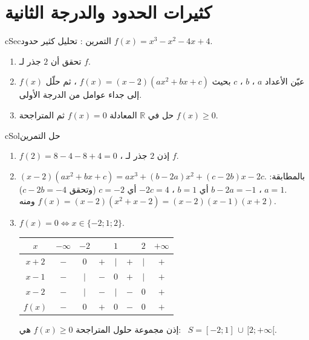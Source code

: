 \documentclass[12pt,a4paper]{article}
\newenvironment{BOX}[2]{\begin{otherlanguage}{english}\begin{arbox}{#1}{#2}}{\end{arbox}\end{otherlanguage}}
\newcounter{exo}
\newenvironment{tamrin}[1]{\stepcounter{exo}\begin{BOX}{cSec}{التمرين \theexo: #1}}{\end{BOX}}
\newenvironment{hal}{\Needspace{12\baselineskip}\begin{otherlanguage}{english}\begin{arbox}[breakable]{cSol}{حل التمرين \theexo}}{\end{arbox}\end{otherlanguage}}
\newcommand{\R}{\mathbb{R}}
\begin{document}
\section{كثيرات الحدود والدرجة الثانية}
\begin{tamrin}{تحليل كثير حدود}
$f(x)=x^3-x^2-4x+4$.
\begin{enumerate}
\item تحقق أن $2$ جذر لـ $f$.
\item عيّن الأعداد $a$ ، $b$ ، $c$ بحيث $f(x)=(x-2)\left(ax^2+bx+c\right)$ ، ثم حلّل $f(x)$ إلى جداء عوامل من الدرجة الأولى.
\item حل في $\R$ المعادلة $f(x)=0$ ثم المتراجحة $f(x)\ge0$.
\end{enumerate}
\end{tamrin}
\begin{hal}
\begin{enumerate}
\item $f(2)=8-4-8+4=0$ ، إذن $2$ جذر لـ $f$.
\item $(x-2)\left(ax^2+bx+c\right)=ax^3+(b-2a)x^2+(c-2b)x-2c$. بالمطابقة:
$a=1$ ، $b-2a=-1$ أي $b=1$ ، $-2c=4$ أي $c=-2$ (وتحقق $c-2b=-4$).\\
ومنه $f(x)=(x-2)\left(x^2+x-2\right)=\boxed{(x-2)(x-1)(x+2)}$.
\item $f(x)=0\iff x\in\{-2;1;2\}$.
\begin{center}
\renewcommand{\arraystretch}{1.4}
\begin{tabular}{|C|C|C|C|C|C|C|C|}\hline
$x$ & $-\infty$ \quad & $-2$ & & $1$ & & $2$ & \quad $+\infty$\\\hline
$x+2$ & $-$ & $0$ & $+$ & $\vert$ & $+$ & $\vert$ & $+$\\\hline
$x-1$ & $-$ & $\vert$ & $-$ & $0$ & $+$ & $\vert$ & $+$\\\hline
$x-2$ & $-$ & $\vert$ & $-$ & $\vert$ & $-$ & $0$ & $+$\\\hline
$f(x)$ & $-$ & $0$ & $+$ & $0$ & $-$ & $0$ & $+$\\\hline
\end{tabular}
\end{center}
إذن مجموعة حلول المتراجحة $f(x)\ge0$ هي: \ $\boxed{S=[-2;1]\,\cup\,[2;+\infty[}$.
\end{enumerate}
\end{hal}
\end{document}
